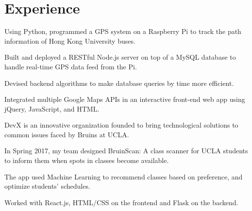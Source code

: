 \documentclass[]{deedy-resume-openfont}
\begin{document}
\hfill
\begin{minipage}[t]{0.66\textwidth} 


\section{Experience}

\vspace{\topsep} %
\begin{tightemize}
\item Using Python, programmed a GPS system on a Raspberry Pi to track the path information of Hong Kong University buses.
\item Built and deployed a RESTful Node.js server on top of a MySQL database to handle real-time GPS data feed from the Pi.
\item Devised backend algorithms to make database queries by time more efficient.
 \item Integrated multiple Google Maps APIs in an interactive front-end web app using jQuery, JavaScript, and HTML.
\end{tightemize}
\sectionsep

\begin{tightemize}
\item DevX is an innovative organization founded to bring technological solutions to common issues faced by Bruins at UCLA. 
\item In Spring 2017, my team designed BruinScan: A class scanner for UCLA students to inform them when spots in classes become available.
\item The app used Machine Learning to recommend classes based on preference, and optimize students' schedules.
\item Worked with React.js, HTML/CSS on the frontend and Flask on the backend.
\end{tightemize}
\sectionsep



\end{minipage}
\end{document}
